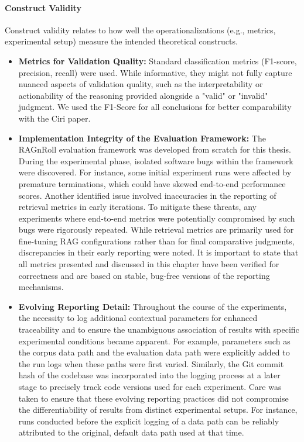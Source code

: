 \paragraph{Construct Validity}
Construct validity relates to how well the operationalizations (e.g., metrics, experimental setup) measure the intended theoretical constructs.
\begin{itemize}
   \item \textbf{Metrics for Validation Quality:} Standard classification metrics (F1-score, precision, recall) were used. While informative, they might not fully capture nuanced aspects of validation quality, such as the interpretability or actionability of the reasoning provided alongside a "valid" or "invalid" judgment. We used the F1-Score for all conclusions for better comparability with the Ciri paper.
   \item \textbf{Implementation Integrity of the Evaluation Framework:} The RAGnRoll evaluation framework was developed from scratch for this thesis. During the experimental phase, isolated software bugs within the framework were discovered. For instance, some initial experiment runs were affected by premature terminations, which could have skewed end-to-end performance scores. Another identified issue involved inaccuracies in the reporting of retrieval metrics in early iterations. To mitigate these threats, any experiments where end-to-end metrics were potentially compromised by such bugs were rigorously repeated. While retrieval metrics are primarily used for fine-tuning RAG configurations rather than for final comparative judgments, discrepancies in their early reporting were noted. It is important to state that all metrics presented and discussed in this chapter have been verified for correctness and are based on stable, bug-free versions of the reporting mechanisms.
   \item \textbf{Evolving Reporting Detail:} Throughout the course of the experiments, the necessity to log additional contextual parameters for enhanced traceability and to ensure the unambiguous association of results with specific experimental conditions became apparent. For example, parameters such as the corpus data path and the evaluation data path were explicitly added to the run logs when these paths were first varied. Similarly, the Git commit hash of the codebase was incorporated into the logging process at a later stage to precisely track code versions used for each experiment. Care was taken to ensure that these evolving reporting practices did not compromise the differentiability of results from distinct experimental setups. For instance, runs conducted before the explicit logging of a data path can be reliably attributed to the original, default data path used at that time.
\end{itemize}

